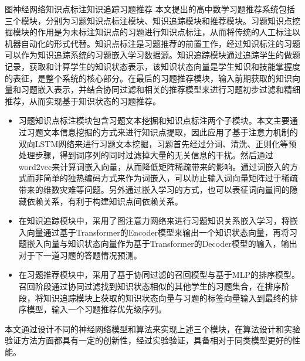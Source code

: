 \begin{abstractC}{图神经网络}{知识点标注}{知识追踪}{习题推荐}{}
    本文提出的高中数学习题推荐系统包括三个模块，分别为习题知识点标注模块、知识追踪模块和推荐模块。习题知识点挖掘模块的作用是为未标注知识点的习题进行知识点标注，从而将传统的人工标注以机器自动化的形式代替。知识点标注是习题推荐的前置工作，经过知识标注的习题可以作为知识追踪系统的习题嵌入学习数据源。知识追踪模块通过追踪学生的做题记录，获取和计算学生的知识状态表示，该知识状态向量是学生知识和技能掌握度的表征，是整个系统的核心部分。在最后的习题推荐模块，输入前期获取的知识向量和习题嵌入表示，并结合协同过滤和相关的推荐模型来进行习题初步过滤和精细推荐，从而实现基于知识状态的习题推荐。
    \begin{itemize}
        \item 习题知识点标注模块包含习题文本挖掘和知识点标注两个子模块。本文主要通过习题文本信息挖掘的方式来进行知识点提取，因此应用了基于注意力机制的双向LSTM网络来进行习题文本挖掘，习题首先经过分词、清洗、正则化等预处理步骤，得到词序列的同时过滤掉大量的无关信息的干扰。然后通过word2vec来计算词嵌入向量，从而降低矩阵稀疏带来的影响。通过词嵌入的方式而非简单的独热编码方式来作为词嵌入，可以防止输入词向量矩阵过于稀疏带来的维数灾难等问题。另外通过嵌入学习的方式，也可以表征词向量间的隐藏依赖关系，有利于构建知识点间依赖关系。
        \item 在知识追踪模块中，采用了图注意力网络来进行习题知识关系嵌入学习，将嵌入向量通过基于Transformer的Encoder模型来输出一个知识状态向量，再将习题嵌入向量与知识状态向量作为基于Transformer的Decoder模型的输入，输出对于下一道习题的答题情况预测。
        \item 在习题推荐模块中，采用了基于协同过滤的召回模型与基于MLP的排序模型。召回阶段通过协同过滤找到知识状态相似的其他学生的习题集合，在排序阶段，将知识追踪模块上获取的知识状态向量与习题的标签向量输入到最终的排序模型，输入一个习题推荐优先级序列。
    \end{itemize}

    本文通过设计不同的神经网络模型和算法来实现上述三个模块，在算法设计和实验验证方法方面都具有一定的创新性，经过实验验证，具备相对于同类模型更好的性能。
\end{abstractC}
